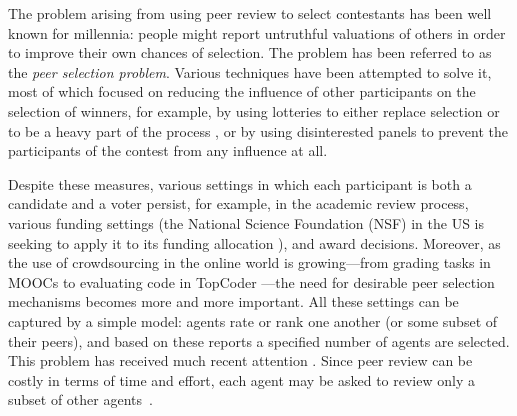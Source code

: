 \documentclass[letterpaper]{article}
\newcommand{\haris}[1]{\textcolor{green}{\textbf{Haris Says: #1}}}
\newcommand{\omer}[1]{\textcolor{purple}{\textbf{Omer Says: #1}}}
\newcommand{\citep}{\cite}
\begin{document}
The problem arising from using peer review to select contestants has been well known for millennia:
people might report untruthful valuations of others in order to improve their own chances of selection.
The problem has been referred to as the \emph{peer selection problem}.
Various techniques have been attempted to solve it, most of which focused on reducing the influence of other participants on the selection of winners, for example, by using lotteries to either replace selection or to be a heavy part of the process \cite{MG07},
or by using disinterested panels to prevent the participants of the contest from any influence at all.

Despite these measures, various settings in which each participant is both a candidate and a voter persist, for example, in the academic review process, various funding settings (the National Science Foundation (NSF) in the US is seeking to apply it to its funding allocation \cite{Haze13a}), and award decisions. Moreover, as the use of crowdsourcing in the online world is growing---from grading tasks in MOOCs to evaluating code in TopCoder \cite{LGE10}---the need for desirable peer selection mechanisms becomes more and more important. All these settings can be captured by a simple model: agents rate or rank one another (or some subset of their peers), and based on these reports a specified number of agents are selected. This problem has received much recent attention \citep{AFPT11a,FeKl14a,HoMo13a,KLMP15b,RRS11a}. Since peer review can be costly in terms of time and effort, each agent may be asked to review only a subset of other agents~\citep{KLMP15b,MeSa09a}.
\end{document}
